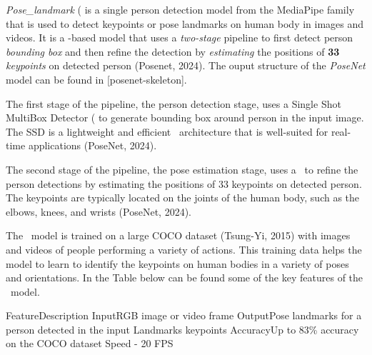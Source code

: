 {\em Pose_landmark} (\PoseNet\) is a single person detection model from the MediaPipe family that is used to detect keypoints or pose landmarks on human body in images and videos. It is a \CNN\--based model that uses a {\em two-stage} pipeline to first detect person {\em bounding box} and then refine the detection by {\em estimating} the positions of {\bf 33} {\em keypoints} on detected person (\scc Posenet, 2024). The ouput structure of the {\em PoseNet} model can be found in [posenet-skeleton].

The first stage of the pipeline, the person detection stage, uses a Single Shot MultiBox Detector (\SSD\) to generate bounding box around person in the input image. The SSD is a lightweight and efficient \CNN\ architecture that is well-suited for real-time applications (\scc PoseNet, 2024).

The second stage of the pipeline, the pose estimation stage, uses a \CNN\ to refine the person detections by estimating the positions of 33 keypoints on detected person. The keypoints are typically located on the joints of the human body, such as the elbows, knees, and wrists (\scc PoseNet, 2024).

The \PoseNet\ model is trained on a large COCO dataset (\scc Tsung-Yi, 2015) with images and videos of people performing a variety of actions. This training data helps the model to learn to identify the keypoints on human bodies in a variety of poses and orientations. In the Table below can be found some of the key features of the \PoseNet\ model.

    \setupTABLE[r][1][style=bold]
    \setupTABLE[c][each][offset=3dd]
    \setupTABLE[frame=off]
    \setupTABLE[r][1][topframe=on,bottomframe=on]
    \setupTABLE[c][each][leftframe=on]
    \setupTABLE[c][1][leftframe=off]
    \bTR
        \bTD Feature\eTD\bTD    Description\eTD\eTR
    \bTR
        \bTD Input\eTD\bTD	    RGB image or video frame\eTD\eTR
    \bTR
            \bTD Output\eTD\bTD	    Pose landmarks for a person detected in the input\eTD\eTR
    \bTR
        \bTD Landmarks\eTD{} keypoints\eTD\eTR
    \bTR
        \bTD Accuracy\eTD\bTD	Up to 83\% accuracy on the COCO dataset\eTD\eTR
    \bTR
        \bTD Speed\eTD{} - 20 FPS\eTD\eTR


